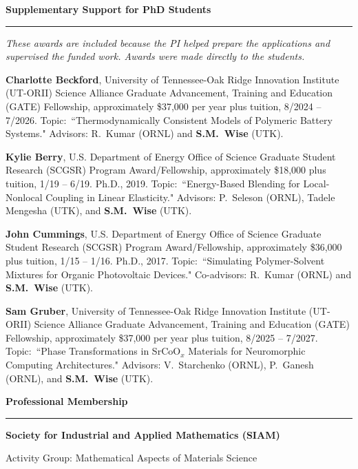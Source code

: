 \documentclass[10pt,letterpaper]{article}
\newcommand{\cvsection}[1]{%
  \Needspace{5\baselineskip}\par\vspace{13pt}%
  {\color{Smokey}\fontsize{15}{17}\selectfont\bfseries #1}\par\vspace{3pt}%
  {\color{UTOrange}\rule{\linewidth}{1.8pt}}\par\vspace{4pt}%
}
\begin{document}
	\smallskip
	
\cvsection{Supplementary Support for PhD Students}

{\small\color{WarmGray}\emph{These awards are included because the PI helped prepare the applications and supervised the funded work. Awards were made directly to the students.}}

	\smallskip
	

    \begin{description}  
	\item
\textbf{Charlotte Beckford}, University of Tennessee-Oak Ridge Innovation Institute (UT-ORII) Science Alliance Graduate Advancement, Training and Education (GATE) Fellowship, approximately \$37,000 per year plus tuition, 8/2024 -- 7/2026. Topic:~``Thermodynamically Consistent Models of Polymeric Battery Systems." Advisors: R.~Kumar (ORNL) and \textbf{S.M.~Wise} (UTK).
    \item
\textbf{Kylie Berry}, U.S. Department of Energy Office of Science Graduate Student Research (SCGSR) Program Award/Fellowship, approximately \$18,000 plus tuition, 1/19 -- 6/19. Ph.D., 2019. Topic:~``Energy-Based Blending for Local-Nonlocal Coupling in Linear Elasticity." Advisors: P.~Seleson (ORNL), Tadele Mengesha (UTK), and \textbf{S.M.~Wise} (UTK).
    \item
\textbf{John Cummings}, U.S. Department of Energy Office of Science Graduate Student Research (SCGSR) Program Award/Fellowship, approximately \$36,000 plus tuition, 1/15 -- 1/16. Ph.D., 2017. Topic:~``Simulating Polymer-Solvent Mixtures for Organic Photovoltaic Devices." Co-advisors: R.~Kumar (ORNL) and \textbf{S.M.~Wise} (UTK).
	\item
\textbf{Sam Gruber}, University of Tennessee-Oak Ridge Innovation Institute (UT-ORII) Science Alliance Graduate Advancement, Training and Education (GATE) Fellowship, approximately \$37,000 per year plus tuition, 8/2025 -- 7/2027. Topic:~``Phase Transformations in SrCoO$_x$ Materials for Neuromorphic Computing Architectures." Advisors: V.~Starchenko (ORNL), P.~Ganesh (ORNL), and \textbf{S.M.~Wise} (UTK).
	\end{description}
  
\cvsection{Professional Membership}
    \begin{description}
    \item
 \textbf{Society for Industrial and Applied Mathematics (SIAM)}
    \begin{description}
    \item
Activity Group: Mathematical Aspects of Materials Science
    \end{description}
    \end{description}
	
\end{document}
